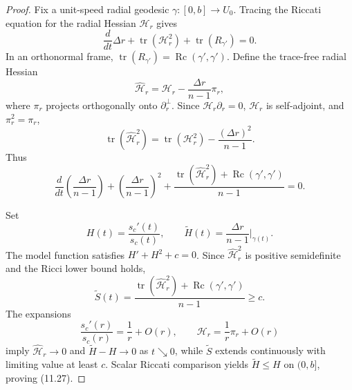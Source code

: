 \begin{proof}
\sketch Fix a unit-speed radial geodesic
$\gamma:[0,b]\to U_0$. Tracing the Riccati equation for the radial Hessian
$\mathcal H_r$ gives
\begin{equation}
\frac d{dt}\Delta r
+\operatorname{tr}(\mathcal H_r^2)
+\operatorname{tr}(R_{\gamma'})=0.
\tag{11.28}
\end{equation}
In an orthonormal frame,
$\operatorname{tr}(R_{\gamma'})=\operatorname{Rc}(\gamma',\gamma')$.
Define the trace-free radial Hessian
\[
\widehat{\mathcal H}_r
=\mathcal H_r-\frac{\Delta r}{n-1}\pi_r,
\]
where $\pi_r$ projects orthogonally onto $\partial_r^\perp$. Since
$\mathcal H_r\partial_r=0$, $\mathcal H_r$ is self-adjoint, and
$\pi_r^2=\pi_r$,
\[
\operatorname{tr}(\widehat{\mathcal H}_r^2)
=\operatorname{tr}(\mathcal H_r^2)-\frac{(\Delta r)^2}{n-1}.
\]
Thus
\begin{equation}
\frac d{dt}\left(\frac{\Delta r}{n-1}\right)
+\left(\frac{\Delta r}{n-1}\right)^2
+\frac{
\operatorname{tr}(\widehat{\mathcal H}_r^2)
+\operatorname{Rc}(\gamma',\gamma')
}{n-1}=0.
\tag{11.30}
\end{equation}

Set
\[
H(t)=\frac{s_c'(t)}{s_c(t)},\qquad
\widetilde H(t)=\frac{\Delta r}{n-1}\bigg|_{\gamma(t)}.
\]
The model function satisfies $H'+H^2+c=0$. Since
$\widehat{\mathcal H}_r^2$ is positive semidefinite and the Ricci lower bound
holds,
\[
\widetilde S(t)
=\frac{
\operatorname{tr}(\widehat{\mathcal H}_r^2)
+\operatorname{Rc}(\gamma',\gamma')
}{n-1}
\geq c.
\]
The expansions
\[
\frac{s_c'(r)}{s_c(r)}=\frac1r+O(r),
\qquad
\mathcal H_r=\frac1r\pi_r+O(r)
\]
imply
$\widehat{\mathcal H}_r\to0$ and
$\widetilde H-H\to0$ as $t\searrow0$, while
$\widetilde S$ extends continuously with limiting value at least $c$.
Scalar Riccati comparison yields $\widetilde H\leq H$ on $(0,b]$, proving
(11.27).
\end{proof}

